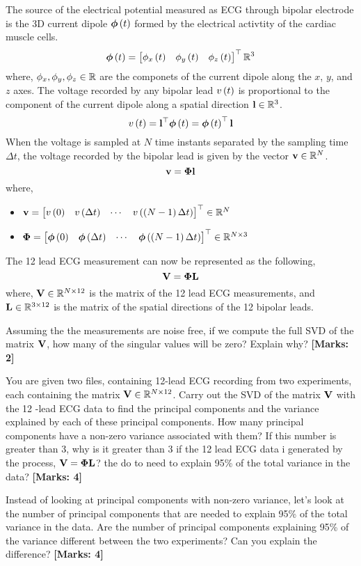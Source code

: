 \documentclass[12pt]{article}
\def\mf{\ensuremath\mathbf}
\def\mb{\ensuremath\mathbb}
\def\lp{\ensuremath\left(}
\def\rp{\ensuremath\right)}
\def\bmx{\ensuremath\begin{bmatrix*}[r]}
\def\emx{\ensuremath\end{bmatrix*}}
\def\bmxc{\ensuremath\begin{bmatrix*}[c]}
\newcommand{\ct}[1]{\lp #1\rp}
\begin{document}
\begin{enumerate}
    The source of the electrical potential measured as ECG through bipolar electrode is the 3D current dipole $\bm{\phi}\ct{t}$ formed by the electrical activtity of the cardiac muscle cells. 
    \[ \bm{\phi}\ct{t} = \bmx \phi_x\ct{t} & \phi_y\ct{t} & \phi_z\ct{t}\emx^\top \mb{R}^3 \]
    where, $\phi_x, \phi_y, \phi_z \in\mb{R}$ are the componets of the current dipole along the $x$, $y$, and $z$ axes. The voltage recorded by any bipolar lead $v\ct{t}$ is proportional to the component of the current dipole along a spatial direction $\mf{l} \in\mb{R}^3$.
    \[ v\ct{t} = \mf{l}^\top \bm{\phi}\ct{t} = \bm{\phi}\ct{t}^\top\mf{l} \]
    When the voltage is sampled at $N$ time instants separated by the sampling time $\Delta t$, the voltage recorded by the bipolar lead is given by the vector $\mf{v} \in\mb{R}^N$.
    \[ \mf{v} = \bm{\Phi} \mf{l} \]
    where, 
    \begin{itemize}
        \item $\mf{v} = \bmxc v\ct{0} & v\ct{\Delta t} & \cdots & v\ct{\ct{N-1}\Delta t} \emx^\top \in \mb{R}^N$
        \item $\bm{\Phi} =\bmx \bm{\phi}\ct{0} & \bm{\phi}\ct{\Delta t} & \cdots & \bm{\phi}\ct{\ct{N - 1}\Delta t} \emx^\top \in \mb{R}^{N \times 3}$
    \end{itemize}
    The 12 lead ECG measurement can now be represented as the following,
    \[ \mf{V} = \bm{\Phi} \mf{L} \]
    where, $\mf{V} \in \mb{R}^{N \times 12}$ is the matrix of the 12 lead ECG measurements, and $\mf{L} \in \mb{R}^{3 \times 12}$ is the matrix of the spatial directions of the 12 bipolar leads. 

    Assuming the the measurements are noise free, if we compute the full SVD of the matrix $\mf{V}$, how many of the singular values will be zero? Explain why? \textbf{[Marks: 2]}

    You are given two files, containing 12-lead ECG recording from two experiments, each containing the matrix $\mf{V} \in \mb{R}^{N \times 12}$. Carry out the SVD of the matrix $\mf{V}$ with the 12 -lead ECG data to find the principal components and the variance explained by each of these principal components. How many principal components have a non-zero variance associated with them? If this number is greater than 3, why is it greater than 3 if the 12 lead ECG data i generated by the process, $\mf{V} = \bm{\Phi}\mf{L}$? the do to need to explain 95\% of the total variance in the data? \textbf{[Marks: 4]}
    
    Instead of looking at principal components with non-zero variance, let's look at the number of principal components that are needed to explain 95\% of the total variance in the data. Are the number of principal components  explaining 95\% of the variance different between the two experiments? Can you explain the difference? \textbf{[Marks: 4]}
\end{enumerate}
\end{document}
